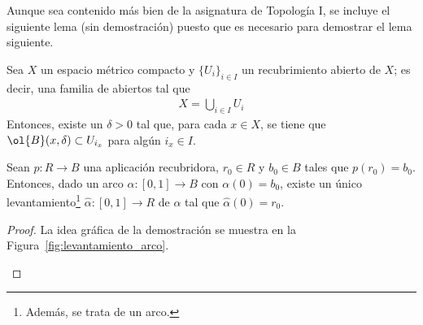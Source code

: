Aunque sea contenido más bien de la asignatura de Topología I, se incluye el siguiente lema (sin demostración) puesto que es necesario para demostrar el lema siguiente.
\begin{lema}[de Lebesgue]
    Sea $X$ un espacio métrico compacto y $\{U_i\}_{i\in I}$ un recubrimiento abierto de $X$; es decir, una familia de abiertos tal que
    \begin{align*}
        X = \bigcup_{i\in I} U_i
    \end{align*}
    Entonces, existe un $\delta>0$ tal que, para cada $x\in X$, se tiene que $\ol{B}(x,\delta)\subset U_{i_x}$ para algún $i_x\in I$.
\end{lema}

\begin{lema}\label{lema:levantamiento_arcos}
    Sean $p:R\to B$ una aplicación recubridora, $r_0\in R$ y $b_0\in B$ tales que $p(r_0)=b_0$. Entonces, dado un arco $\alpha:[0,1]\to B$ con $\alpha(0)=b_0$, existe un único levantamiento\footnote{Además, se trata de un arco.} $\hat{\alpha}:[0,1]\to R$ de $\alpha$ tal que $\hat{\alpha}(0) = r_0$.
    \begin{proof}
        La idea gráfica de la demostración se muestra en la Figura~\ref{fig:levantamiento_arco}.
        \begin{figure}
            \centering
\end{figure}
\end{proof}
\end{lema}
